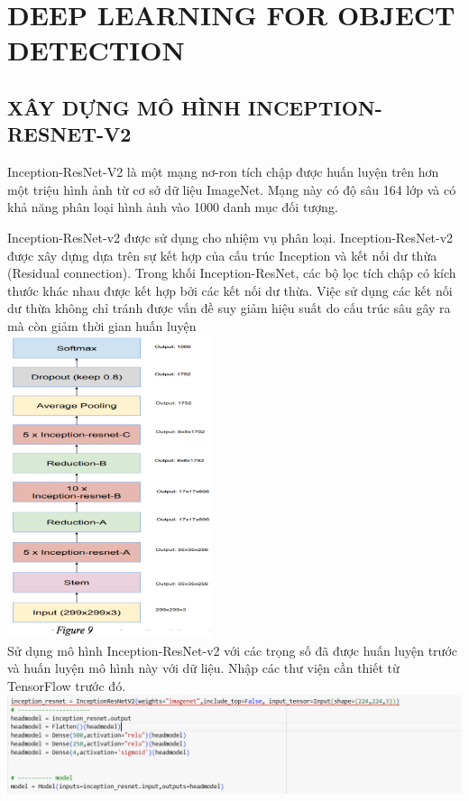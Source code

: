 \documentclass{article}
\begin{document}
\section {DEEP LEARNING FOR OBJECT DETECTION}
\subsection{XÂY DỰNG MÔ HÌNH INCEPTION-RESNET-V2}

 Inception-ResNet-V2 là một mạng nơ-ron tích chập được huấn luyện trên hơn một triệu hình ảnh từ cơ sở dữ liệu ImageNet. Mạng này có độ sâu 164 lớp và có khả năng phân loại hình ảnh vào 1000 danh mục đối tượng.

 Inception-ResNet-v2 được sử dụng cho nhiệm vụ phân loại. Inception-ResNet-v2 được xây dựng dựa trên sự kết hợp của cấu trúc Inception và kết nối dư thừa (Residual connection). Trong khối Inception-ResNet, các bộ lọc tích chập có kích thước khác nhau được kết hợp bởi các kết nối dư thừa. Việc sử dụng các kết nối dư thừa không chỉ tránh được vấn đề suy giảm hiệu suất do cấu trúc sâu gây ra mà còn giảm thời gian huấn luyện \\ 
 
\includegraphics[width= 6cm]{img/img1/Notebook7.png} \\

Sử dụng mô hình Inception-ResNet-v2 với các trọng số đã được huấn luyện trước và huấn luyện mô hình này với dữ liệu. Nhập các thư viện cần thiết từ TensorFlow trước đó. \\

\includegraphics[width = 15cm]{img/img1/4.1.png} \\ 
\end{document}
